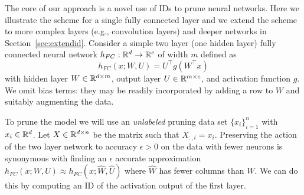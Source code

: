 The core of our approach is a novel use of IDs to 
prune neural networks. Here we illustrate the scheme for a single fully connected layer and we extend the scheme to more complex layers (e.g., convolution layers) and deeper networks in Section~\ref{sec:extendid}.
Consider a simple two layer (one hidden layer) fully connected neural network $h_{FC} : \mathbb{R}^d \to \mathbb{R}^c$ of width $m$ defined as 
\begin{equation*}
\label{eq:1hiddenfc}
    h_{FC}(x; W, U)
    =
    U^\top g(W^\top x)
\end{equation*}
with hidden layer $W \in \mathbb{R}^{d \times m}$, output layer $U \in \mathbb{R}^{m \times c}$, and activation function $g$. 
We omit bias terms: they may be readily incorporated by adding a row to $W$ and suitably augmenting the data.

To prune the model we will use an \emph{unlabeled} pruning data set  $\{x_i\}^{n}_{i=1}$ with $x_i \in \mathbb{R}^d$.
Let $X \in \mathbb{R}^{d \times n}$ be the matrix such that $X_{:,i} = x_i$.
Preserving the action of the two layer network to accuracy $\epsilon > 0$ on the data with fewer neurons is synonymous with finding an $\epsilon$ accurate approximation
$h_{FC}(x;W,U) \approx h_{FC}(x; \widehat{W},\widehat{U})$ 
where $\widehat{W}$ has fewer columns than $W$.
We can do this by computing an ID of the activation output of the first layer.

